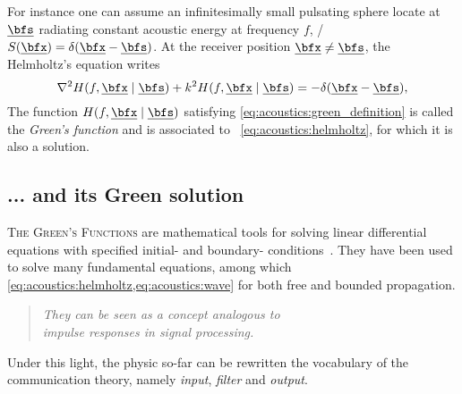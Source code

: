 For instance one can assume an infinitesimally small pulsating sphere locate at $\positionSource$ radiating constant acoustic energy at frequency $f$,
\ie/ $S(\positionMicrophone) = \delta(\positionMicrophone - \positionSource)$.
At the receiver position $\positionMicrophone \neq \positionSource$, the Helmholtz's equation writes
\begin{equation}
    \label{eq:acoustics:green_definition}
    \knabla^2 H(f, \positionMicrophone \mid \positionSource)
     + k^2 H(f, \positionMicrophone \mid \positionSource) = - \delta(\positionMicrophone - \positionSource)
    ,
\end{equation}
The function $H(f, \positionMicrophone \mid \positionSource)$ satisfying \cref{eq:acoustics:green_definition} is called the \textit{Green's function} and is
associated to ~\cref{eq:acoustics:helmholtz}, for which it is also a solution.

\subsection{... and its Green solution}
\textsc{The Green's Functions} are mathematical tools for solving linear differential equations with specified initial- and boundary- conditions~.
They have been used to solve many fundamental equations, among which \cref{eq:acoustics:helmholtz,eq:acoustics:wave} for both free and bounded propagation.
\begin{quote}
    \textit{
    They can be seen as a concept analogous to
    \\ \emph{impulse responses}
    in signal processing.
    }
\end{quote}
Under this light, the physic so-far can be rewritten  the vocabulary of the communication theory, namely \textit{input}, \textit{filter} and \textit{output}.


